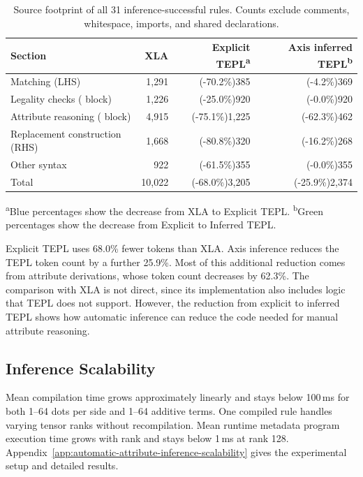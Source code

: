 \begin{table}[!htbp]
\caption{Source footprint of all 31 inference-successful rules.
Counts exclude comments, whitespace, imports, and shared declarations.}
\label{tab:specification-size}
\small
{}
\setlength{\tabcolsep}{4pt}
\begin{tabularx}{\linewidth}{@{}Yrrr@{}}\toprule
Section & XLA & Explicit TEPL\textsuperscript{a} & Axis inferred TEPL\textsuperscript{b}\\\midrule
Matching (LHS) & 1,291 & \textcolor{specificationBlue}{(-70.2\%)}385 & \textcolor{specificationGreen}{(-4.2\%)}369\\
Legality checks ( block) & 1,226 & \textcolor{specificationBlue}{(-25.0\%)}920 & \textcolor{specificationGreen}{(-0.0\%)}920\\
Attribute reasoning ( block) & 4,915 & \textcolor{specificationBlue}{(-75.1\%)}1,225 & \textcolor{specificationGreen}{(-62.3\%)}462\\
Replacement construction (RHS) & 1,668 & \textcolor{specificationBlue}{(-80.8\%)}320 & \textcolor{specificationGreen}{(-16.2\%)}268\\
Other syntax & 922 & \textcolor{specificationBlue}{(-61.5\%)}355 & \textcolor{specificationGreen}{(-0.0\%)}355\\\midrule
Total & 10,022 & \textcolor{specificationBlue}{(-68.0\%)}3,205 & \textcolor{specificationGreen}{(-25.9\%)}2,374\\\bottomrule
\end{tabularx}
\par\smallskip
{\footnotesize\raggedright
\textsuperscript{a}\textcolor{specificationBlue}{Blue percentages} show the decrease from XLA to Explicit TEPL.
\textsuperscript{b}\textcolor{specificationGreen}{Green percentages} show the decrease from Explicit to Inferred TEPL.\par}
\end{table}

Explicit TEPL uses 68.0\% fewer tokens than XLA.
Axis inference reduces the TEPL token count by a further 25.9\%.
Most of this additional reduction comes from attribute derivations,
whose token count decreases by 62.3\%.
The comparison with XLA is not direct, since its implementation
also includes logic that TEPL does not support.
However, the reduction from explicit to inferred TEPL shows how
automatic inference can reduce the code needed for manual attribute
reasoning.

\subsection{Inference Scalability}
\label{sec:inference-scalability}
Mean compilation time grows approximately linearly and stays below 100\,ms
for both 1--64 dots per side and 1--64 additive terms. One compiled rule
handles varying tensor ranks without recompilation. Mean runtime metadata
program execution time grows with rank and stays below 1\,ms at rank 128.
Appendix~\ref{app:automatic-attribute-inference-scalability} gives the experimental setup and
detailed results.

